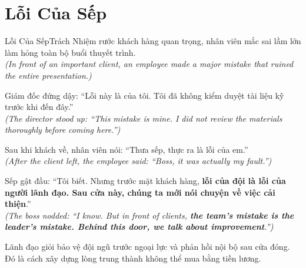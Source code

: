 \section{Lỗi Của Sếp}
\begin{truyen}{Lỗi Của Sếp}{Trách Nhiệm}
rước khách hàng quan trọng, nhân viên mắc sai lầm lớn làm hỏng toàn bộ buổi thuyết trình.\\
\textit{(In front of an important client, an employee made a major mistake that ruined the entire presentation.)}

Giám đốc đứng dậy: ``Lỗi này là của tôi. Tôi đã không kiểm duyệt tài liệu kỹ trước khi đến đây.''\\
\textit{(The director stood up: ``This mistake is mine. I did not review the materials thoroughly before coming here.'')}

Sau khi khách về, nhân viên nói: ``Thưa sếp, thực ra là lỗi của em.''\\
\textit{(After the client left, the employee said: ``Boss, it was actually my fault.'')}

Sếp gật đầu: ``Tôi biết. Nhưng trước mặt khách hàng, \textbf{lỗi của đội là lỗi của người lãnh đạo. Sau cửa này, chúng ta mới nói chuyện về việc cải thiện}.''\\
\textit{(The boss nodded: ``I know. But in front of clients, \textbf{the team's mistake is the leader's mistake. Behind this door, we talk about improvement}.'')}
\end{truyen}
\begin{baihoc}
  Lãnh đạo giỏi bảo vệ đội ngũ trước ngoại lực và phản hồi nội bộ sau cửa đóng. Đó là cách xây dựng lòng trung thành không thể mua bằng tiền lương.
\end{baihoc}

